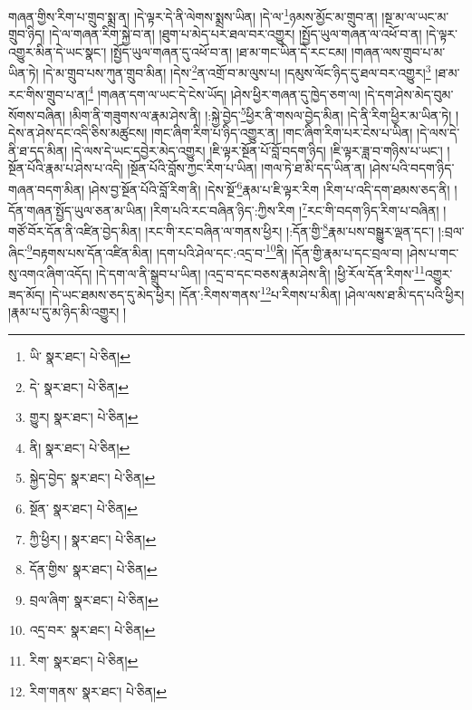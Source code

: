 གཞན་གྱིས་རིག་པ་གྲུབ་སྨྲ་ན། །དེ་ལྟར་དེ་ནི་ལེགས་སྨྲས་ཡིན། །དེ་ལ་\footnote{ཡི་  སྣར་ཐང་།  པེ་ཅིན། }ཉམས་མྱོང་མ་གྲུབ་ན། །སྔ་མ་ལ་ཡང་མ་གྲུབ་ཉིད། །དེ་ལ་གཞན་རིག་སྐྱེ་བ་ན། །ཐུག་པ་མེད་པར་ཐལ་བར་འགྱུར། །སྤྱོད་ཡུལ་གཞན་ལ་འཕོ་བ་ན། །དེ་ལྟར་འགྱུར་མིན་དེ་ཡང་སྣང་། །སྤྱོད་ཡུལ་གཞན་དུ་འཕོ་བ་ན། །ཐ་མ་གང་ཡིན་དེ་རང་ངམ། །གཞན་ལས་གྲུབ་པ་མ་ཡིན་ཏེ། །དེ་མ་གྲུབ་པས་ཀུན་གྲུབ་མིན། །དེས་\footnote{དེ་  སྣར་ཐང་།  པེ་ཅིན། }ན་འགྲོ་བ་མ་ལུས་པ། །དམུས་ལོང་ཉིད་དུ་ཐལ་བར་འགྱུར།\footnote{གྱུར།  སྣར་ཐང་།  པེ་ཅིན། } །ཐ་མ་རང་གིས་གྲུབ་པ་ན།\footnote{ནི།  སྣར་ཐང་།  པེ་ཅིན། } །གཞན་དག་ལ་ཡང་དེ་ངེས་ཡོད། །ཤེས་ཕྱིར་གཞན་དུ་ཁྱེད་ཅག་ལ། །དེ་དག་ཤེས་མེད་བུམ་སོགས་བཞིན། །མིག་ནི་གཟུགས་ལ་རྣམ་ཤེས་ནི། །:སྐྱེ་བྱེད་\footnote{སྐྱེད་བྱེད་  སྣར་ཐང་།  པེ་ཅིན། }ཕྱིར་ནི་གསལ་བྱེད་མིན། །དེ་ནི་རིག་ཕྱིར་མ་ཡིན་ཏེ། །དེས་ན་ཤེས་དང་འདི་ཅིས་མཚུངས། །གང་ཞིག་རིག་པ་ཉིད་འགྱུར་ན། །གང་ཞིག་རིག་པར་ངེས་པ་ཡིན། །དེ་ལས་དེ་ནི་ཐ་དད་མིན། །དེ་ལས་དེ་ཡང་དབྱེར་མེད་འགྱུར། །ཇི་ལྟར་སྔོན་པོ་བློ་བདག་ཉིད། །ཇི་ལྟར་ཟླ་བ་གཉིས་པ་ཡང་། །སྔོན་པོའི་རྣམ་པ་ཤེས་པ་འདི། །སྔོན་པོའི་བློས་ཀྱང་རིག་པ་ཡིན། །གལ་ཏེ་ཐ་མི་དད་ཡིན་ན། །ཤེས་པའི་བདག་ཉིད་གཞན་བདག་མིན། །ཤེས་བྱ་སྔོན་པོའི་བློ་རིག་ནི། །དེས་སྔོ་\footnote{སྔོན་  སྣར་ཐང་།  པེ་ཅིན། }རྣམ་པ་ཇི་ལྟར་རིག །རིག་པ་འདི་དག་ཐམས་ཅད་ནི། །དོན་གཞན་སྤྱོད་ཡུལ་ཅན་མ་ཡིན། །རིག་པའི་རང་བཞིན་ཉིད་:ཀྱིས་རིག །\footnote{ཀྱི་ཕྱིར། །  སྣར་ཐང་།  པེ་ཅིན། }རང་གི་བདག་ཉིད་རིག་པ་བཞིན། །གཙོ་བོར་དོན་ནི་འཛིན་བྱེད་མིན། །རང་གི་རང་བཞིན་ལ་གནས་ཕྱིར། །:དོན་གྱི་\footnote{དོན་གྱིས་  སྣར་ཐང་།  པེ་ཅིན། }རྣམ་པས་བསྒྱུར་ལྡན་དང་། །:བྲལ་ཞིང་\footnote{བྲལ་ཞིག་  སྣར་ཐང་།  པེ་ཅིན། }བརྟགས་པས་དོན་འཛིན་མིན། །དག་པའི་ཤེལ་དང་:འདྲ་བ་\footnote{འདྲ་བར་  སྣར་ཐང་།  པེ་ཅིན། }ནི། །དོན་གྱི་རྣམ་པ་དང་བྲལ་བ། །ཤེས་པ་གང་སུ་འགའ་ཞིག་འདོད། །དེ་དག་ལ་ནི་སྒྲུབ་པ་ཡིན། །འདྲ་བ་དང་བཅས་རྣམ་ཤེས་ནི། །ཕྱི་རོལ་དོན་རིགས་\footnote{རིག་  སྣར་ཐང་།  པེ་ཅིན། }འགྱུར་ཟད་མོད། །དེ་ཡང་ཐམས་ཅད་དུ་མེད་ཕྱིར། །དོན་:རིགས་གནས་\footnote{རིག་གནས་  སྣར་ཐང་།  པེ་ཅིན། }པ་རིགས་པ་མིན། །ཤེལ་ལས་ཐ་མི་དད་པའི་ཕྱིར། །རྣམ་པ་དུ་མ་ཉིད་མི་འགྱུར། །
